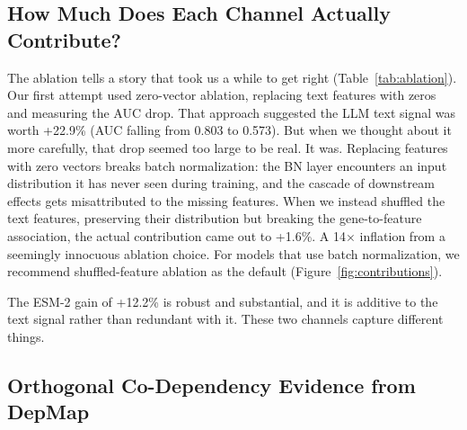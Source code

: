 \documentclass[12pt,a4paper]{article}
\begin{document}
\subsection{How Much Does Each Channel Actually Contribute?}

\begin{table}[ht]
\centering
\caption{Component ablation with methodological correction (Fold1)}
\label{tab:ablation}
\end{table}

The ablation tells a story that took us a while to get right (Table~\ref{tab:ablation}). Our first attempt used zero-vector ablation, replacing text features with zeros and measuring the AUC drop. That approach suggested the LLM text signal was worth +22.9\% (AUC falling from 0.803 to 0.573). But when we thought about it more carefully, that drop seemed too large to be real. It was. Replacing features with zero vectors breaks batch normalization: the BN layer encounters an input distribution it has never seen during training, and the cascade of downstream effects gets misattributed to the missing features. When we instead shuffled the text features, preserving their distribution but breaking the gene-to-feature association, the actual contribution came out to +1.6\%. A 14$\times$ inflation from a seemingly innocuous ablation choice. For models that use batch normalization, we recommend shuffled-feature ablation as the default (Figure~\ref{fig:contributions}).

The ESM-2 gain of +12.2\% is robust and substantial, and it is additive to the text signal rather than redundant with it. These two channels capture different things.

\subsection{Orthogonal Co-Dependency Evidence from DepMap}
\end{document}
